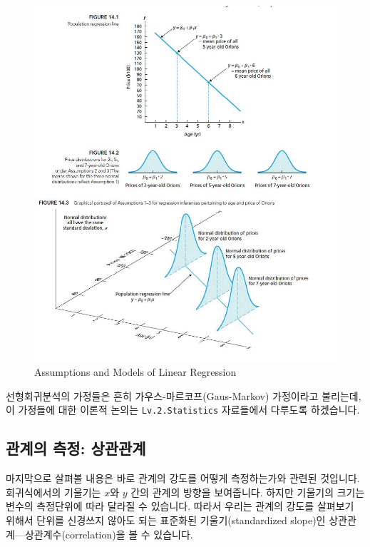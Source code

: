 \documentclass[]{book}
\begin{document}
\begin{figure}

{\centering \includegraphics[width=5.53in]{./Chapters_pdfR/plot/regression_model2} 

}

\caption{Assumptions and Models of Linear Regression}\label{fig:unnamed-chunk-217}
\end{figure}

선형회귀분석의 가정들은 흔히 가우스-마르코프(Gaus-Markov) 가정이라고 불리는데, 이 가정들에 대한 이론적 논의는 \texttt{Lv.2.Statistics} 자료들에서 다루도록 하겠습니다.

\hypertarget{uxad00uxacc4uxc758-uxce21uxc815-uxc0c1uxad00uxad00uxacc4}{%
\subsection{관계의 측정: 상관관계}\label{uxad00uxacc4uxc758-uxce21uxc815-uxc0c1uxad00uxad00uxacc4}}

마지막으로 살펴볼 내용은 바로 관계의 강도를 어떻게 측정하는가와 관련된 것입니다. 회귀식에서의 기울기는 \(x\)와 \(y\) 간의 관계의 방향을 보여줍니다. 하지만 기울기의 크기는 변수의 측정단위에 따라 달라질 수 있습니다. 따라서 우리는 관계의 강도를 살펴보기 위해서 단위를 신경쓰지 않아도 되는 표준화된 기울기(standardized slope)인 상관관계---상관계수(correlation)을 볼 수 있습니다.
\end{document}
